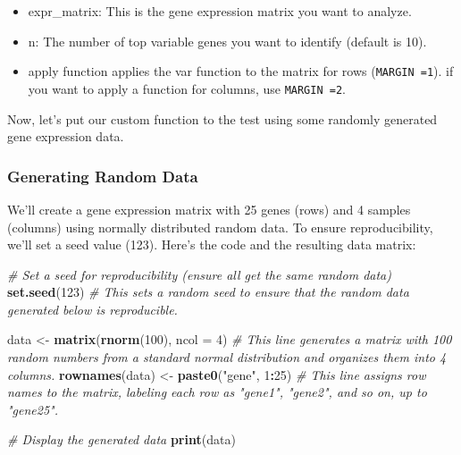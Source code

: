 \documentclass[
]{book}
\newenvironment{Shaded}{\begin{snugshade}}{\end{snugshade}}
\newcommand{\AttributeTok}[1]{\textcolor[rgb]{0.13,0.29,0.53}{#1}}
\newcommand{\CommentTok}[1]{\textcolor[rgb]{0.56,0.35,0.01}{\textit{#1}}}
\newcommand{\DecValTok}[1]{\textcolor[rgb]{0.00,0.00,0.81}{#1}}
\newcommand{\FunctionTok}[1]{\textcolor[rgb]{0.13,0.29,0.53}{\textbf{#1}}}
\newcommand{\NormalTok}[1]{#1}
\newcommand{\OtherTok}[1]{\textcolor[rgb]{0.56,0.35,0.01}{#1}}
\newcommand{\SpecialCharTok}[1]{\textcolor[rgb]{0.81,0.36,0.00}{\textbf{#1}}}
\newcommand{\StringTok}[1]{\textcolor[rgb]{0.31,0.60,0.02}{#1}}
\begin{document}
\begin{itemize}
\item
  expr\_matrix: This is the gene expression matrix you want to analyze.
\item
  n: The number of top variable genes you want to identify (default is 10).
\item
  apply function applies the var function to the matrix for rows (\texttt{MARGIN\ =1}). if you want to apply a function for columns, use \texttt{MARGIN\ =2}.
\end{itemize}

Now, let's put our custom function to the test using some randomly generated gene expression data.

\hypertarget{generating-random-data}{%
\subsubsection{Generating Random Data}\label{generating-random-data}}

We'll create a gene expression matrix with 25 genes (rows) and 4 samples (columns) using normally distributed random data. To ensure reproducibility, we'll set a seed value (123). Here's the code and the resulting data matrix:

\begin{Shaded}
\begin{Highlighting}[]
\CommentTok{\# Set a seed for reproducibility (ensure all get the same random data)}
\FunctionTok{set.seed}\NormalTok{(}\DecValTok{123}\NormalTok{)  }\CommentTok{\# This sets a random seed to ensure that the random data generated below is reproducible.}

\NormalTok{data }\OtherTok{\textless{}{-}} \FunctionTok{matrix}\NormalTok{(}\FunctionTok{rnorm}\NormalTok{(}\DecValTok{100}\NormalTok{), }\AttributeTok{ncol =} \DecValTok{4}\NormalTok{)  }\CommentTok{\# This line generates a matrix with 100 random numbers from a standard normal distribution and organizes them into 4 columns.}
\FunctionTok{rownames}\NormalTok{(data) }\OtherTok{\textless{}{-}} \FunctionTok{paste0}\NormalTok{(}\StringTok{"gene"}\NormalTok{, }\DecValTok{1}\SpecialCharTok{:}\DecValTok{25}\NormalTok{)  }\CommentTok{\# This line assigns row names to the matrix, labeling each row as "gene1", "gene2", and so on, up to "gene25".}

\CommentTok{\# Display the generated data}
\FunctionTok{print}\NormalTok{(data)}
\end{Highlighting}
\end{Shaded}
\end{document}
